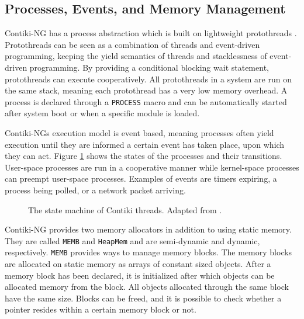 \documentclass[0-thesis.tex]{subfiles}
\begin{document}
\subsection{Processes, Events, and Memory Management}
\label{ssec:process-event-memory}
Contiki-NG has a process abstraction which is built on lightweight protothreads
\parencite{protothreads}. Protothreads can be seen as a combination of threads and
event-driven programming, keeping the yield semantics of threads and stacklessness of
event-driven programming. By providing a conditional blocking wait statement, protothreads
can execute cooperatively. All protothreads in a system are run on the same stack, meaning
each protothread has a very low memory overhead. A process is declared through a
\texttt{PROCESS} macro and can be automatically started after system boot or when a
specific module is loaded. 

Contiki-NGs execution model is event based, meaning processes often yield execution until
they are informed a certain event has taken place, upon which they can act. Figure
\ref{fig:state-machine} shows the states of the processes and their transitions.
User-space processes are run in a cooperative manner while kernel-space processes can
preempt user-space processes. Examples of events are timers expiring, a process being
polled, or a network packet arriving.

\begin{figure}
    \label{fig:state-machine}
    \caption{The state machine of Contiki threads. Adapted from \parencite{contiki-multithreading}.}
\end{figure}

Contiki-NG provides two memory allocators in addition to using static memory. They are
called \texttt{MEMB} and \texttt{HeapMem} and are semi-dynamic and dynamic, respectively.
\texttt{MEMB} provides ways to manage memory blocks. The memory blocks are allocated on
static memory as arrays of constant sized objects. After a memory block has been declared,
it is initialized after which objects can be allocated memory from the block. All objects
allocated through the same block have the same size. Blocks can be freed, and it is
possible to check whether a pointer resides within a certain memory block or not.
\end{document}
